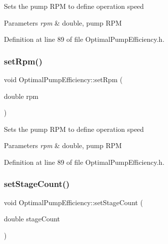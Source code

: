 Sets the pump R\+PM to define operation speed 
\begin{DoxyParams}{Parameters}
{\em rpm} & double, pump R\+PM \\
\hline
\end{DoxyParams}


Definition at line 89 of file Optimal\+Pump\+Efficiency.\+h.

\mbox{\label{class_optimal_pump_efficiency_afc6b6f46b4e289efc8819249ad1c9fb5}} 
\subsubsection{\texorpdfstring{set\+Rpm()}{setRpm()}\hspace{0.1cm}{\footnotesize\ttfamily [3/3]}}
{\footnotesize\ttfamily void Optimal\+Pump\+Efficiency\+::set\+Rpm (\begin{DoxyParamCaption}\item[{double}]{rpm }\end{DoxyParamCaption})\hspace{0.3cm}{\ttfamily [inline]}}

Sets the pump R\+PM to define operation speed 
\begin{DoxyParams}{Parameters}
{\em rpm} & double, pump R\+PM \\
\hline
\end{DoxyParams}


Definition at line 89 of file Optimal\+Pump\+Efficiency.\+h.

\mbox{\label{class_optimal_pump_efficiency_a5b0b2a24a87c1c8fc92aa96c6ba4b727}} 
\subsubsection{\texorpdfstring{set\+Stage\+Count()}{setStageCount()}\hspace{0.1cm}{\footnotesize\ttfamily [1/3]}}
{\footnotesize\ttfamily void Optimal\+Pump\+Efficiency\+::set\+Stage\+Count (\begin{DoxyParamCaption}\item[{double}]{stage\+Count }\end{DoxyParamCaption})\hspace{0.3cm}{\ttfamily [inline]}}

